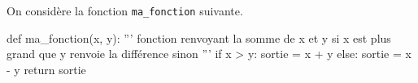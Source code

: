 \documentclass[a4paper,10pt]{report}
\def\ptsexoA{4}
\begin{document}

\renewcommand{\labelitemi}{\textbullet} %


\pagestyle{DS_FP}          %
\NomPrenomNote{}


\exods{\ptsexoA}


On considère la fonction \verb|ma_fonction| suivante.

\begin{CodePythontexAlt}[TaillePolice=\large,Largeur=1\linewidth,Centre,PremLigne=1]{}
def ma_fonction(x, y):
    ''' fonction renvoyant la somme de x et y si x est plus grand que y 
    renvoie la différence sinon '''
    if x > y:
        sortie = x + y
    else:
        sortie = x - y 
    return sortie
\end{CodePythontexAlt}
\end{document}
